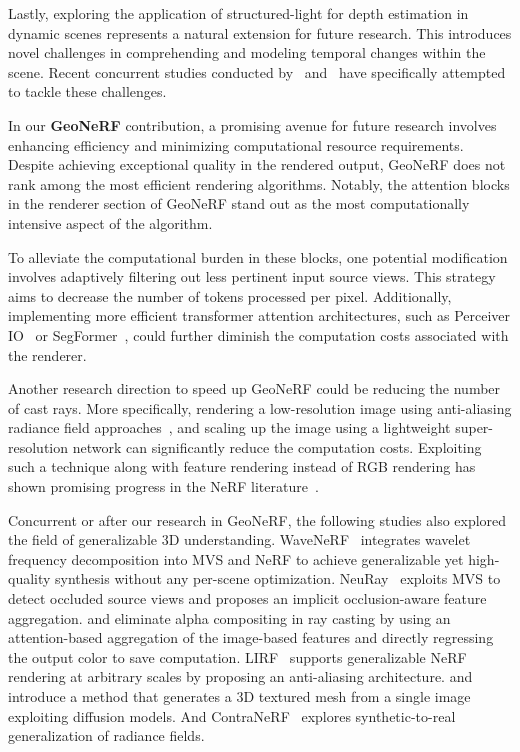 Lastly, exploring the application of structured-light for depth estimation in dynamic scenes represents a natural extension for future research. This introduces novel challenges in comprehending and modeling temporal changes within the scene. Recent concurrent studies conducted by~\cite{qiao2022tide} and~\cite{qiao2023online} have specifically attempted to tackle these challenges.

In our \textbf{GeoNeRF} contribution, a promising avenue for future research involves enhancing efficiency and minimizing computational resource requirements. Despite achieving exceptional quality in the rendered output, GeoNeRF does not rank among the most efficient rendering algorithms. Notably, the attention blocks in the renderer section of GeoNeRF stand out as the most computationally intensive aspect of the algorithm.

To alleviate the computational burden in these blocks, one potential modification involves adaptively filtering out less pertinent input source views. This strategy aims to decrease the number of tokens processed per pixel. Additionally, implementing more efficient transformer attention architectures, such as Perceiver IO~\citep{jaegle2021perceiver} or SegFormer~\citep{xie2021segformer}, could further diminish the computation costs associated with the renderer.

Another research direction to speed up GeoNeRF could be reducing the number of cast rays. More specifically, rendering a low-resolution image using anti-aliasing radiance field approaches~\citep{Barron_2021_ICCV, hu2023tri}, and scaling up the image using a lightweight super-resolution network can significantly reduce the computation costs. Exploiting such a technique along with feature rendering instead of RGB rendering has shown promising progress in the NeRF literature~\citep{huang2023refsr,wang20224k,han2024volume}.

Concurrent or after our research in GeoNeRF, the following studies also explored the field of generalizable 3D understanding. WaveNeRF~\cite{xu2023wavenerf} integrates wavelet frequency decomposition into MVS and NeRF to achieve generalizable yet high-quality synthesis without any per-scene optimization. NeuRay~\citep{liu2022neural} exploits MVS to detect occluded source views and proposes an implicit occlusion-aware feature aggregation. \cite{du2023learning} and \cite{suhail2022generalizable} eliminate alpha compositing in ray casting by using an attention-based aggregation of the image-based features and directly regressing the output color to save computation. LIRF~\citep{huang2023local} supports generalizable NeRF rendering at arbitrary scales by proposing an anti-aliasing architecture. \cite{liu2024one} and \citep{liu2023onetwo} introduce a method that generates a 3D textured mesh from a single image exploiting diffusion models. And ContraNeRF~\citep{yang2023contranerf} explores synthetic-to-real generalization of radiance fields.

